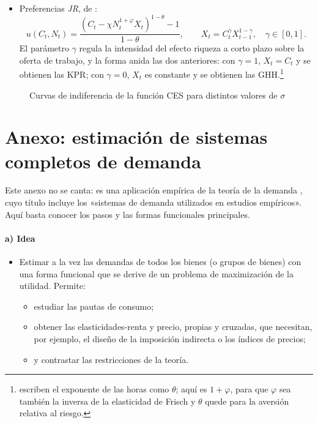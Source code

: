 \documentclass[11pt]{article}
\begin{document}
\begin{itemize}
\begin{itemize}
  \item Preferencias \emph{JR}, de \textcite{JaimovichRebelo2009News}:
    \begin{equation}
    u(C_t,N_t)=\frac{\left(C_t-\chi N_t^{1+\varphi}X_t\right)^{1-\theta}-1}{1-\theta},\qquad X_t=C_t^{\gamma}X_{t-1}^{1-\gamma},\quad\gamma\in[0,1]. \label{eq:jr}
    \end{equation}
    El parámetro $\gamma$ regula la intensidad del efecto riqueza a corto plazo sobre la oferta de trabajo, y la forma anida las dos anteriores: con $\gamma=1$, $X_t=C_t$ y se obtienen las KPR; con $\gamma=0$, $X_t$ es constante y se obtienen las GHH.\footnote{\textcite{JaimovichRebelo2009News} escriben el exponente de las horas como $\theta$; aquí es $1+\varphi$, para que $\varphi$ sea también la inversa de la elasticidad de Frisch y $\theta$ quede para la aversión relativa al riesgo.}
  \end{itemize}
\end{itemize}

\begin{figure}[H]
\centering
\caption{Curvas de indiferencia de la función CES para distintos valores de $\sigma$}\label{fig:ces-curvas-indiferencia}
\end{figure}

\section{Anexo: estimación de sistemas completos de demanda}\label{anexo:sistemas}

\begin{notaopositor}
Este anexo no se canta: es una aplicación empírica de la teoría de la demanda , cuyo título incluye los «sistemas de demanda utilizados en estudios empíricos». Aquí basta conocer los pasos y las formas funcionales principales.
\end{notaopositor}

\paragraph{a) Idea}

\begin{itemize}
\item Estimar a la vez las demandas de todos los bienes (o grupos de bienes) con una forma funcional que se derive de un problema de maximización de la utilidad. Permite\nocite{DeatonMuellbauer1980Economics,AguilarMateos2015Deaton}:
  \begin{itemize}
  \item estudiar las pautas de consumo;
  \item obtener las elasticidades-renta y precio, propias y cruzadas, que necesitan, por ejemplo, el diseño de la imposición indirecta o los índices de precios;
  \item y contrastar las restricciones de la teoría.
  \end{itemize}
\end{itemize}
\end{document}
